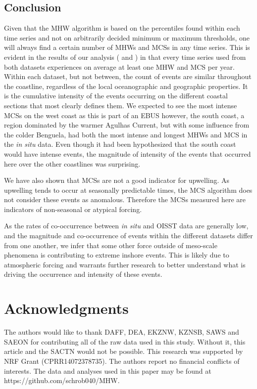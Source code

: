 \documentclass[a4paper,10pt,review]{elsarticle}
\begin{document}
\subsection{Conclusion}
Given that the MHW algorithm is based on the percentiles found within each time series and not on arbitrarily decided minimum or maximum thresholds, one will always find a certain number of MHWs and MCSs in any time series. This is evident in the results of our analysis ( and ) in that every time series used from both datasets experiences on average at least one MHW and MCS per year. Within each dataset, but not between, the count of events are similar throughout the coastline, regardless of the local oceanographic and geographic properties. It is the cumulative intensity of the events occurring on the different coastal sections that most clearly defines them. We expected to see the most intense MCSs on the west coast as this is part of an EBUS however, the south coast, a region dominated by the warmer Agulhas Current, but with some influence from the colder Benguela, had both the most intense and longest MHWs and MCS in the \emph{in situ} data. Even though it had been hypothesized that the south coast would have intense events, the magnitude of intensity of the events that occurred here over the other coastlines was surprising.

We have also shown that MCSs are not a good indicator for upwelling. As upwelling tends to occur at seasonally predictable times, the MCS algorithm does not consider these events as anomalous. Therefore the MCSs measured here are indicators of non-seasonal or atypical forcing.

As the rates of co-occurrence between \emph{in situ} and OISST data are generally low, and the magnitude and co-occurrence of events within the different datasets differ from one another, we infer that some other force outside of meso-scale phenomena is contributing to extreme inshore events. This is likely due to atmospheric forcing and warrants further research to better understand what is driving the occurrence and intensity of these events.

\section{Acknowledgments}
The authors would like to thank DAFF, DEA, EKZNW, KZNSB, SAWS and SAEON for contributing all of the raw data used in this study. Without it, this article and the SACTN would not be possible. This research was supported by NRF Grant (CPRR14072378735). The authors report no financial conflicts of interests. The data and analyses used in this paper may be found at https://github.com/schrob040/MHW.
\end{document}
